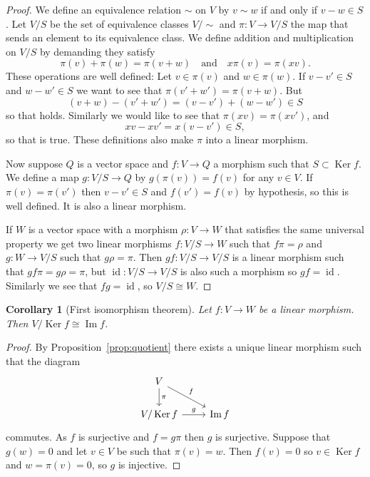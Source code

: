 \documentclass[11pt]{article}
\newtheorem{coro}[theo]{Corollary}
\theoremstyle{definition}
\DeclareMathOperator{\Ker}{Ker}
\DeclareMathOperator{\Img}{Im}
\DeclareMathOperator{\id}{id}
\begin{document}
\begin{proof}
We define an equivalence relation $\sim$ on $V$ by $v \sim w$ if and only if $v-w \in S$.
Let $V/S$ be the set of equivalence classes $V/\sim$ and $\pi : V \to V/S$ the map that sends an element to its equivalence class.
We define addition and multiplication on $V/S$ by demanding they satisfy
\[
\pi(v) + \pi(w) = \pi(v + w)
\quad\text{and}\quad
x \pi(v) = \pi(xv).
\]
These operations are well defined:
Let $v \in \pi(v)$ and $w \in \pi(w)$.
If $v - v' \in S$ and $w - w' \in S$ we want to see that $\pi(v' + w') = \pi(v + w)$.
But
\[
(v + w) - (v' + w')
= (v - v') + (w - w')
\in S
\]
so that holds.
Similarly we would like to see that $\pi(xv) = \pi(xv')$, and
\[
xv - xv' = x(v - v') \in S,
\]
so that is true.
These definitions also make $\pi$ into a linear morphism.

Now suppose $Q$ is a vector space and $f : V \to Q$ a morphism such that $S \subset \Ker f$.
We define a map $g : V/S \to Q$ by $g(\pi(v)) = f(v)$ for any $v \in V$.
If $\pi(v) = \pi(v')$ then $v - v' \in S$ and $f(v') = f(v)$ by hypothesis, so this is well defined.
It is also a linear morphism.

If $W$ is a vector space with a morphism $\rho : V \to W$ that satisfies the same universal property we get two linear morphisms $f : V/S \to W$ such that $f \pi = \rho$ and $g : W \to V/S$ such that $g \rho = \pi$.
Then $gf : V/S \to V/S$ is a linear morphism such that $gf\pi = g\rho = \pi$, but $\id : V/S \to V/S$ is also such a morphism so $gf = \id$.
Similarly we see that $fg = \id$, so $V/S \cong W$.
\end{proof}



\begin{coro}[First isomorphism theorem]
\label{prop:first_isomorphism_thm}
Let $f : V \to W$ be a linear morphism.
Then $V / \Ker f \cong \Img f$.
\end{coro}

\begin{proof}
By Proposition~\ref{prop:quotient} there exists a unique linear morphism such that the diagram
\[
\begin{tikzcd}
V \ar[d,"\pi"] \ar[dr,"f"] &
\\
V / \Ker f \ar[r,"g"] & \Img f
\end{tikzcd}
\]
commutes.
As $f$ is surjective and $f = g\pi$ then $g$ is surjective.
Suppose that $g(w) = 0$ and let $v \in V$ be such that $\pi(v) = w$.
Then $f(v) = 0$ so $v \in \Ker f$ and $w = \pi(v) = 0$, so $g$ is injective.
\end{proof}
\end{document}
